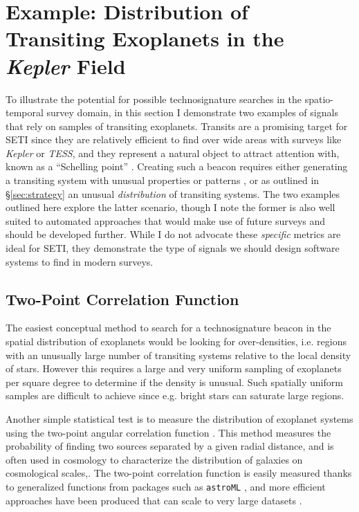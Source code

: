 \documentclass[twocolumn]{aastex62}
\newcommand{\Kepler}{\textsl{Kepler}\xspace}
\newcommand{\TESS}{\textsl{TESS}\xspace}
\begin{document}
\section{Example: Distribution of Transiting Exoplanets in the {\it Kepler} Field}
\label{sec:transit}

To illustrate the potential for possible technosignature searches in the spatio-temporal survey domain, in this section I demonstrate two examples of signals that rely on samples of transiting exoplanets. Transits are a promising target for SETI since they are relatively efficient to find over wide areas with surveys like \Kepler \citep{borucki2010} or \TESS, and they represent a natural object to attract attention with, known as a ``Schelling point'' \citep{wright2017}. Creating such a beacon requires either generating a transiting system with unusual properties or patterns \citep[e.g.][]{arnold2005,kipping2016,forgan2017}, or as outlined in \S\ref{sec:strategy} an unusual {\it distribution} of transiting systems. The two examples outlined here explore the latter scenario, though I note the former is also well suited to automated approaches that would make use of future surveys and should be developed further. While I do not advocate these {\it specific} metrics are ideal for SETI, they demonstrate the type of signals we should design software systems to find in modern surveys.


\subsection{Two-Point Correlation Function}
\label{sec:2pt}

The easiest conceptual method to search for a technosignature beacon in the spatial distribution of exoplanets would be looking for over-densities, i.e. regions with an unusually large number of transiting systems relative to the local density of stars. However this requires a large and very uniform sampling of exoplanets per square degree to determine if the density is unusual. Such spatially uniform samples are difficult to achieve since e.g. bright stars can saturate large regions.


Another simple statistical test is to measure the distribution of exoplanet systems using the two-point angular correlation function \citep{landy1993}. This method measures the probability of finding two sources separated by a given radial distance, and is often used in cosmology to characterize the distribution of galaxies on cosmological scales,. The two-point correlation function is easily measured thanks to generalized functions from packages such as {\tt astroML} \citep{astroMLText}, and  more efficient approaches have been produced that can scale to very large datasets \citep[e.g.][]{wang2013}.
\end{document}
